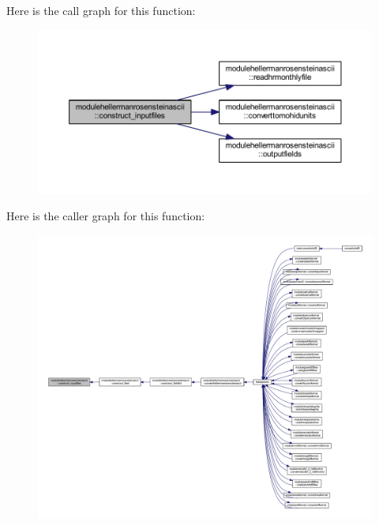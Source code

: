 Here is the call graph for this function\+:\nopagebreak
\begin{figure}[H]
\begin{center}
\leavevmode
\includegraphics[width=350pt]{namespacemodulehellermanrosensteinascii_a6ad7240d2c79e9b8cf9e5e96021b2650_cgraph}
\end{center}
\end{figure}
Here is the caller graph for this function\+:\nopagebreak
\begin{figure}[H]
\begin{center}
\leavevmode
\includegraphics[width=350pt]{namespacemodulehellermanrosensteinascii_a6ad7240d2c79e9b8cf9e5e96021b2650_icgraph}
\end{center}
\end{figure}
\mbox{\label{namespacemodulehellermanrosensteinascii_aa865ee380c14fc3435be60b54b2d2513}} 
